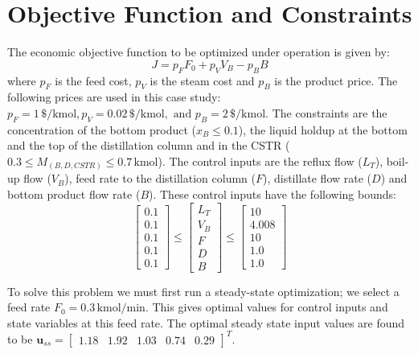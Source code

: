 \section{Objective Function and Constraints}
The economic objective function to be optimized under operation is given by:
	\begin{equation}
		J=p_FF_0+p_VV_B-p_BB
	\end{equation}
where $p_F$ is the feed cost, $p_V$ is the steam cost and $p_B$ is the product price.
The following prices are used in this case study: $p_F=1\, \si{\$\per\kilo\mole}, p_V=0.02\, \si{\$\per\kilo\mole},\text{ and } p_B=2\, \si{\$\per\kilo\mole}$.
The constraints are the concentration of the bottom product ($x_B\leq 0.1$), the liquid holdup at the bottom and the top of the distillation column and in the CSTR ($0.3\leq M_{(B,D,CSTR)}\leq 0.7\,\si{\kilo\mole}$).
The control inputs are the reflux flow ($L_T$), boil-up flow ($V_B$), feed rate to the distillation column ($F$), distillate flow rate ($D$) and bottom product flow rate ($B$).
These control inputs have the following bounds:
\begin{equation}
	\begin{bmatrix} 0.1\\0.1\\0.1\\0.1\\0.1\end{bmatrix}\leq
	\begin{bmatrix} L_T \\ V_B\\F\\D\\B\end{bmatrix}\leq
	\begin{bmatrix} 10\\4.008\\10\\1.0\\1.0\end{bmatrix}
\end{equation}
\par
To solve this problem we must first run a steady-state optimization; we select a feed rate $F_0=0.3\, \si{\kilo\mole\per\minute}$.
This gives optimal values for control inputs and state variables at this feed rate.
The optimal steady state input values are found to be $\boldsymbol{u}_{ss}=\begin{bmatrix}1.18 & 1.92 & 1.03 & 0.74 & 0.29\end{bmatrix}^T$.
\par
